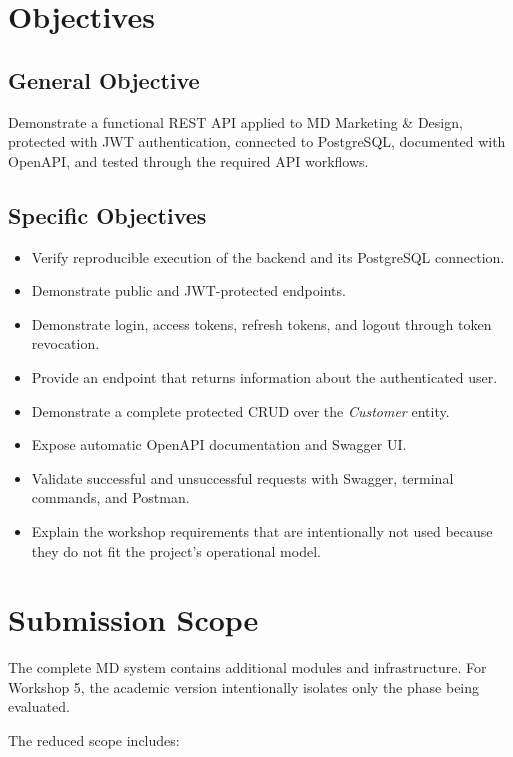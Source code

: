\documentclass[11pt,a4paper]{article}
\begin{document}
\section{Objectives}

\subsection{General Objective}

Demonstrate a functional REST API applied to MD Marketing \& Design, protected with JWT authentication, connected to PostgreSQL, documented with OpenAPI, and tested through the required API workflows.

\subsection{Specific Objectives}

\begin{itemize}[leftmargin=*]
    \item Verify reproducible execution of the backend and its PostgreSQL connection.
    \item Demonstrate public and JWT-protected endpoints.
    \item Demonstrate login, access tokens, refresh tokens, and logout through token revocation.
    \item Provide an endpoint that returns information about the authenticated user.
    \item Demonstrate a complete protected CRUD over the \textit{Customer} entity.
    \item Expose automatic OpenAPI documentation and Swagger UI.
    \item Validate successful and unsuccessful requests with Swagger, terminal commands, and Postman.
    \item Explain the workshop requirements that are intentionally not used because they do not fit the project's operational model.
\end{itemize}

\section{Submission Scope}

The complete MD system contains additional modules and infrastructure. For Workshop 5, the academic version intentionally isolates only the phase being evaluated.

The reduced scope includes:
\end{document}
